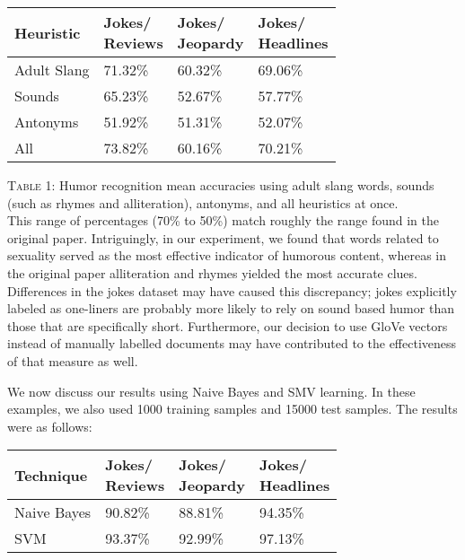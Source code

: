 \documentclass[11pt,a4paper]{article}
\begin{document}
\begin{center}
  \begin{tabular}{|p{1.5cm}|p{1.5cm}|p{1.5cm}|p{1.5cm}|}
    \hline
    Heuristic & \thead{Jokes/ \\ Reviews} & \thead{Jokes/ \\ Jeopardy} & \thead{Jokes/ \\ Headlines} \\
    \hline
    Adult Slang & 71.32\% & 60.32\% & 69.06\% \\
    \hline
    Sounds & 65.23\% & 52.67\% & 57.77\% \\
    \hline
    Antonyms & 51.92\% & 51.31\% & 52.07\% \\
    \hline
    All & 73.82\% & 60.16\% & 70.21\% \\
    \hline
\end{tabular}
\end{center}

\noindent \textsc{Table 1}: Humor recognition mean accuracies using adult slang words, sounds (such as rhymes and alliteration), antonyms, and all heuristics at once.\\

This range of percentages (70\% to 50\%) match roughly the range found in the original paper. Intriguingly, in our experiment, we found that words related to sexuality served as the most effective indicator of humorous content, whereas in the original paper alliteration and rhymes yielded the most accurate clues. Differences in the jokes dataset may have caused this discrepancy; jokes explicitly labeled as one-liners are probably more likely to rely on sound based humor than those that are specifically short. Furthermore, our decision to use GloVe vectors instead of manually labelled documents may have contributed to the effectiveness of that measure as well.

We now discuss our results using Naive Bayes and SMV learning. In these examples, we also used 1000 training samples and 15000 test samples. The results were as follows:

\begin{center}
  \begin{tabular}{|p{1.5cm}|p{1.5cm}|p{1.5cm}|p{1.5cm}|}
    \hline
    Technique & \thead{Jokes/ \\ Reviews} & \thead{Jokes/ \\ Jeopardy} & \thead{Jokes/ \\ Headlines} \\
    \hline
    Naive Bayes & 90.82\% & 88.81\% & 94.35\% \\
    \hline
    SVM & 93.37\% & 92.99\% & 97.13\% \\
    \hline
\end{tabular}
\end{center}
\end{document}
